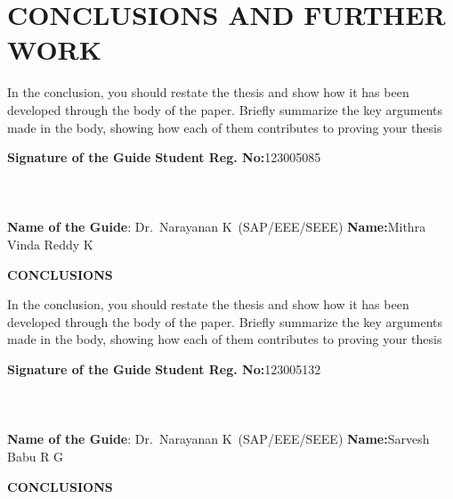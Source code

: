 	\chapter{CONCLUSIONS AND FURTHER WORK}
	\label{chap:conclusion}
	
	
	In the conclusion, you should restate the thesis and show how it has been developed through the body of the paper. Briefly summarize the key arguments made in the body, showing how each of them contributes to proving your thesis
	
	
	\vspace*{24pt}
	
	\noindent \textbf{Signature of the Guide} \hspace*{69mm} \textbf{Student Reg. No:}123005085\\
		\\
	\\
	\\
\noindent \textbf{Name of the Guide}:{ Dr.~Narayanan K}~(SAP/EEE/SEEE) \hspace*{7mm} \textbf{Name:}Mithra Vinda Reddy K
\pagebreak
	\pagebreak
	

	\begin{center}
		\Large{{\textbf{CONCLUSIONS}}}
	\end{center}
In the conclusion, you should restate the thesis and show how it has been developed through the body of the paper. Briefly summarize the key arguments made in the body, showing how each of them contributes to proving your thesis	
	
	
	\vspace*{24pt}
	
	\noindent \textbf{Signature of the Guide} \hspace*{66mm} \textbf{Student Reg. No:}123005132\\
		\\
	\\
	\\
\noindent \textbf{Name of the Guide}:{ Dr.~Narayanan K}~(SAP/EEE/SEEE) \hspace*{10 mm} \textbf{Name:}Sarvesh Babu R G
\pagebreak
	\pagebreak
	
	
	\begin{center}
		\Large{{\textbf{CONCLUSIONS}}}
	\end{center}
	

